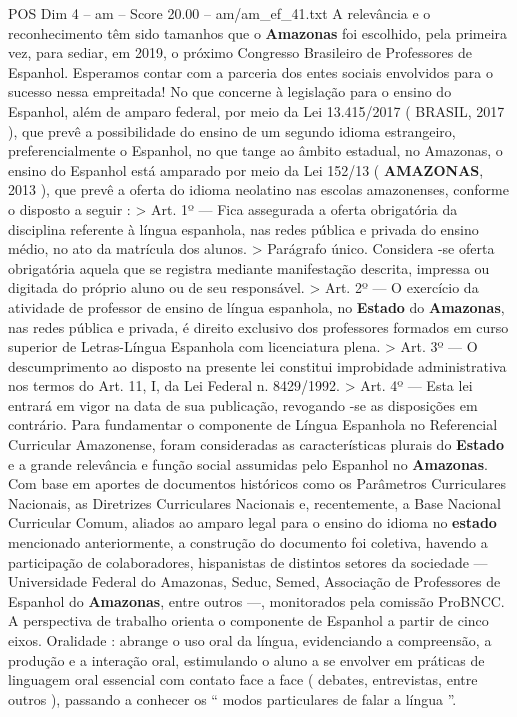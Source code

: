 \begin{textsample}{POS Dim 4 – am – Score 20.00 – am/am\_ef\_41.txt}
A relevância e o reconhecimento têm sido tamanhos que o \textbf{Amazonas} foi escolhido, pela primeira vez, para sediar, em 2019, o próximo Congresso Brasileiro de Professores de Espanhol.
Esperamos contar com a parceria dos entes sociais envolvidos para o sucesso nessa empreitada!
No que concerne à legislação para o ensino do Espanhol, além de amparo federal, por meio da Lei 13.415/2017 ( BRASIL, 2017 ), que prevê a possibilidade do ensino de um segundo idioma estrangeiro, preferencialmente o Espanhol, no que tange ao âmbito estadual, no Amazonas, o ensino do Espanhol está amparado por meio da Lei 152/13 ( \textbf{AMAZONAS}, 2013 ), que prevê a oferta do idioma neolatino nas escolas amazonenses, conforme o disposto a seguir : > Art. 1º — Fica assegurada a oferta obrigatória da disciplina referente à língua espanhola, nas redes pública e privada do ensino médio, no ato da matrícula dos alunos. > Parágrafo único.
Considera -se oferta obrigatória aquela que se registra mediante manifestação descrita, impressa ou digitada do próprio aluno ou de seu responsável. > Art. 2º — O exercício da atividade de professor de ensino de língua espanhola, no \textbf{Estado} do \textbf{Amazonas}, nas redes pública e privada, é direito exclusivo dos professores formados em curso superior de Letras-Língua Espanhola com licenciatura plena. > Art. 3º — O descumprimento ao disposto na presente lei constitui improbidade administrativa nos termos do Art. 11, I, da Lei Federal n. 8429/1992. > Art. 4º — Esta lei entrará em vigor na data de sua publicação, revogando -se as disposições em contrário.
Para fundamentar o componente de Língua Espanhola no Referencial Curricular Amazonense, foram consideradas as características plurais do \textbf{Estado} e a grande relevância e função social assumidas pelo Espanhol no \textbf{Amazonas}.
Com base em aportes de documentos históricos como os Parâmetros Curriculares Nacionais, as Diretrizes Curriculares Nacionais e, recentemente, a Base Nacional Curricular Comum, aliados ao amparo legal para o ensino do idioma no \textbf{estado} mencionado anteriormente, a construção do documento foi coletiva, havendo a participação de colaboradores, hispanistas de distintos setores da sociedade — Universidade Federal do Amazonas, Seduc, Semed, Associação de Professores de Espanhol do \textbf{Amazonas}, entre outros —, monitorados pela comissão ProBNCC.
A perspectiva de trabalho orienta o componente de Espanhol a partir de cinco eixos.
Oralidade : abrange o uso oral da língua, evidenciando a compreensão, a produção e a interação oral, estimulando o aluno a se envolver em práticas de linguagem oral essencial com contato face a face ( debates, entrevistas, entre outros ), passando a conhecer os “ modos particulares de falar a língua ”.

\end{textsample}
